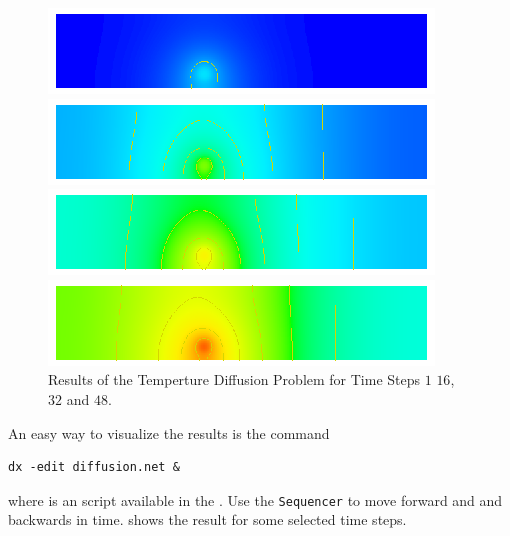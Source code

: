 \begin{figure}
\centerline{\includegraphics[width=\figwidth]{DiffusionRes1}}
\centerline{\includegraphics[width=\figwidth]{DiffusionRes16}}
\centerline{\includegraphics[width=\figwidth]{DiffusionRes32}}
\centerline{\includegraphics[width=\figwidth]{DiffusionRes48}}
\caption{Results of the Temperture Diffusion Problem for Time Steps $1$ $16$, $32$ and $48$.}
\label{DIFFUSION FIG 2}
\end{figure}

An easy way to visualize the results is the command
\begin{verbatim}
dx -edit diffusion.net &
\end{verbatim}
where  is an \OpenDX script available in the \ExampleDirectory.
Use the \texttt{Sequencer} to move forward and and backwards in time. 
 shows the result for some selected time steps.